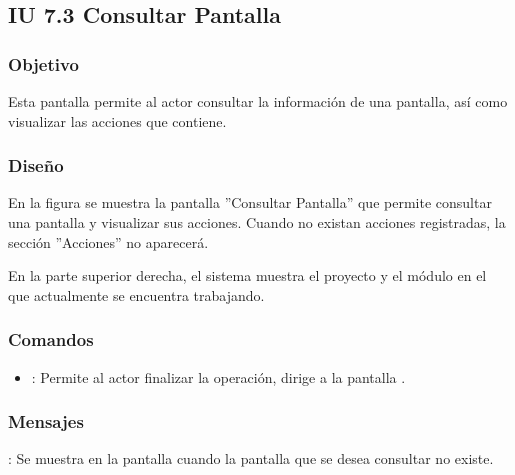 \subsection{IU 7.3 Consultar Pantalla}

\subsubsection{Objetivo}
	Esta pantalla permite al actor consultar la información de una pantalla, así como visualizar las acciones que contiene.
\subsubsection{Diseño}
	En la figura  se muestra la pantalla ''Consultar Pantalla'' que permite consultar una pantalla y visualizar sus acciones. Cuando no existan acciones registradas, la sección ''Acciones'' no aparecerá.
	
	En la parte superior derecha, el sistema muestra el proyecto y el módulo en el que actualmente se encuentra trabajando.

\subsubsection{Comandos}
\begin{itemize}
	\item {}: Permite al actor finalizar la operación, dirige a la pantalla .
\end{itemize}

\subsubsection{Mensajes}

\begin{Citemize}
	\item {}: Se muestra en la pantalla  cuando la pantalla que se desea consultar no existe.
\end{Citemize}
